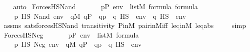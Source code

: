 \begin{isabellebody}
\ \ \isamarkupfalse%
\ auto%
\endisatagproof
{\isafoldproof}%
%
\isadelimproof
\isanewline
%
\endisadelimproof
\isanewline
{}\isamarkupfalse%
\ ForcesHS{\isacharunderscore}{\kern0pt}Nand{\isacharcolon}{\kern0pt}\isanewline
\ \ \isanewline
\ \ \ \ {\isachardoublequoteopen}p{\isasymin}P{\isachardoublequoteclose}\ {\isachardoublequoteopen}env\ {\isasymin}\ list{\isacharparenleft}{\kern0pt}M{\isacharparenright}{\kern0pt}{\isachardoublequoteclose}\ {\isachardoublequoteopen}{\isasymphi}{\isasymin}formula{\isachardoublequoteclose}\ {\isachardoublequoteopen}{\isasympsi}{\isasymin}formula{\isachardoublequoteclose}\isanewline
\ \ \isanewline
\ \ \ \ {\isachardoublequoteopen}{\isacharparenleft}{\kern0pt}p\ {\isasymtturnstile}HS\ Nand{\isacharparenleft}{\kern0pt}{\isasymphi}{\isacharcomma}{\kern0pt}{\isasympsi}{\isacharparenright}{\kern0pt}\ env{\isacharparenright}{\kern0pt}\ {\isasymlongleftrightarrow}\ {\isasymnot}{\isacharparenleft}{\kern0pt}{\isasymexists}q{\isasymin}M{\isachardot}{\kern0pt}\ q{\isasymin}P\ {\isasymand}\ q{\isasympreceq}p\ {\isasymand}\ {\isacharparenleft}{\kern0pt}q\ {\isasymtturnstile}HS\ {\isasymphi}\ env{\isacharparenright}{\kern0pt}\ {\isasymand}\ {\isacharparenleft}{\kern0pt}q\ {\isasymtturnstile}HS\ {\isasympsi}\ env{\isacharparenright}{\kern0pt}{\isacharparenright}{\kern0pt}{\isachardoublequoteclose}\isanewline
%
\isadelimproof
\ \ %
\endisadelimproof
%
\isatagproof
{}\isamarkupfalse%
\ assms\ sats{\isacharunderscore}{\kern0pt}forcesHS{\isacharunderscore}{\kern0pt}Nand{\isacharprime}{\kern0pt}\ transitivity\ P{\isacharunderscore}{\kern0pt}in{\isacharunderscore}{\kern0pt}M\ pair{\isacharunderscore}{\kern0pt}in{\isacharunderscore}{\kern0pt}M{\isacharunderscore}{\kern0pt}iff\ leq{\isacharunderscore}{\kern0pt}in{\isacharunderscore}{\kern0pt}M\ leq{\isacharunderscore}{\kern0pt}abs\ \isanewline
\ \ \isamarkupfalse%
\ simp%
\endisatagproof
{\isafoldproof}%
%
\isadelimproof
\isanewline
%
\endisadelimproof
\isanewline
{}\isamarkupfalse%
\ ForcesHS{\isacharunderscore}{\kern0pt}Neg{\isacharcolon}{\kern0pt}\isanewline
\ \ \isanewline
\ \ \ \ {\isachardoublequoteopen}p{\isasymin}P{\isachardoublequoteclose}\ {\isachardoublequoteopen}env\ {\isasymin}\ list{\isacharparenleft}{\kern0pt}M{\isacharparenright}{\kern0pt}{\isachardoublequoteclose}\ {\isachardoublequoteopen}{\isasymphi}{\isasymin}formula{\isachardoublequoteclose}\ \isanewline
\ \ \isanewline
\ \ \ \ {\isachardoublequoteopen}{\isacharparenleft}{\kern0pt}p\ {\isasymtturnstile}HS\ Neg{\isacharparenleft}{\kern0pt}{\isasymphi}{\isacharparenright}{\kern0pt}\ env{\isacharparenright}{\kern0pt}\ {\isasymlongleftrightarrow}\ {\isasymnot}{\isacharparenleft}{\kern0pt}{\isasymexists}q{\isasymin}M{\isachardot}{\kern0pt}\ q{\isasymin}P\ {\isasymand}\ q{\isasympreceq}p\ {\isasymand}\ {\isacharparenleft}{\kern0pt}q\ {\isasymtturnstile}HS\ {\isasymphi}\ env{\isacharparenright}{\kern0pt}{\isacharparenright}{\kern0pt}{\isachardoublequoteclose}\isanewline

\end{isabellebody}

